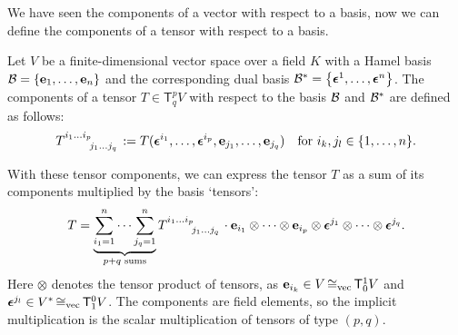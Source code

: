 We have seen the components of a vector with respect to a basis, now we can define the components of a tensor with respect to a basis.
\begin{definition}
    Let \(V\) be a finite-dimensional vector space over a field \(K\) with a Hamel basis \(\mathcal B = \qty{\vb{e}_1, \ldots, \vb{e}_n}\) and the corresponding dual basis \(\mathcal B^* = \qty{\vb*{\epsilon}^1, \ldots, \vb*{\epsilon}^n}\). The components of a tensor \(T \in \mathsf{T}^p_q V\) with respect to the basis \(\mathcal B\) and \(\mathcal B^*\) are defined as follows:
    \begin{equation}
        \tensor{T}{^{i_1 \ldots i_p}_{j_1 \ldots j_q}} := T(\vb*{\epsilon}^{i_1}, \ldots, \vb*{\epsilon}^{i_p}, \vb{e}_{j_1}, \ldots, \vb{e}_{j_q}) \quad \text{for } i_k, j_l \in \qty{1, \ldots, n}.
    \end{equation}
\end{definition}
With these tensor components, we can express the tensor \(T\) as a sum of its components multiplied by the basis `tensors':
\begin{equation}
    T = \underbrace{\sum_{i_1 = 1}^{n} \cdots \sum_{j_q = 1}^{n}}_{p + q \text{ sums}} \tensor{T}{^{i_1 \ldots i_p}_{j_1 \ldots j_q}} \cdot \vb{e}_{i_1} \otimes \cdots \otimes \vb{e}_{i_p} \otimes \vb*{\epsilon}^{j_1} \otimes \cdots \otimes \vb*{\epsilon}^{j_q}.
\end{equation}
Here \(\otimes\) denotes the tensor product of tensors, as \(\vb{e}_{i_k} \in V \operatorname{\cong_{\text{vec}}} \mathsf{T}^1_0 V\) and \(\vb*{\epsilon}^{j_l} \in V^* \operatorname{\cong_{\text{vec}}} \mathsf{T}^0_1 V\). The components are field elements, so the implicit multiplication is the scalar multiplication of tensors of type \((p, q)\).

